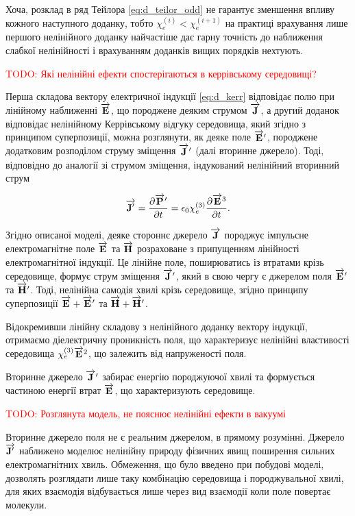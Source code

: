 Хоча, розклад в ряд Тейлора \eqref{eq:d_teilor_odd} не гарантує зменшення 
впливу кожного наступного доданку, тобто $ \chi_e^{(i)} < \chi_e^{(i+1)} $
на практиці врахування лише першого нелінійного доданку найчастіше дає
гарну точність до наближення слабкої нелінійності і врахуванням доданків
вищих порядків нехтують.

\textcolor{red}{TODO: Які нелінійні ефекти спостерігаються в 
керрівському середовищі?}

Перша складова вектору електричної індукції \eqref{eq:d_kerr} відповідає 
полю при лінійному наближенні $ \overrightarrow{\mathbf E} $, що породжене деяким 
струмом $ \overrightarrow{\mathbf J} $, а другий доданок відповідає нелінійному Керрівському 
відгуку середовища, який згідно з принципом суперпозиції, можна розглянути, 
як деяке поле $ \overrightarrow{\mathbf E}^\prime $, породжене додатковим розподілом струму 
зміщення $ \overrightarrow{\mathbf J}^\prime $ (далі вторинне джерело). Тоді, відповідно до
аналогії зі струмом зміщення, індукований нелінійний вторинний струм

\begin{equation} \label{eq:j_kerr}
\overrightarrow{\mathbf J^\prime} = \frac{\partial \overrightarrow{\mathbf P}^\prime}{\partial t} = 
\epsilon_0 \chi_e^{(3)} \frac{\partial \overrightarrow{\mathbf E}^3}{\partial t}.
\end{equation}

Згідно описаної моделі, деяке стороннє джерело $ \overrightarrow{\mathbf J} $ породжує 
імпульсне електромагнітне поле $ \overrightarrow{\mathbf E} $ та $ \overrightarrow{\mathbf H} $ розраховане
з припущенням лінійності електромагнітної індукції. Це лінійне поле, 
поширюватись із втратами крізь середовище, формує струм зміщення 
$ \overrightarrow{\mathbf J}^\prime $, який в свою чергу є джерелом поля $ \overrightarrow{\mathbf E}^\prime $ 
та $ \overrightarrow{\mathbf H}^\prime $. Тоді, нелінійна самодія хвилі крізь середовище, 
згідно принципу суперпозиції $ \overrightarrow{\mathbf E} + \overrightarrow{\mathbf E}^\prime $ та 
$ \overrightarrow{\mathbf H} + \overrightarrow{\mathbf H}^\prime $.

Відокремивши лінійну складову з нелінійного доданку вектору індукції, 
отримаємо діелектричну проникність поля, що характеризує нелінійні 
властивості середовища $ \chi_e^{(3)} \overrightarrow{\mathbf E}^2 $, що залежить від 
напруженості поля.

Вторинне джерело $ \overrightarrow{\mathbf J}^\prime $ забирає енергію породжуючої хвилі та 
формується частиною енергії втрат $ \overrightarrow{\mathbf E} $, що характеризують середовище.

\textcolor{red}{TODO: Розглянута модель, не пояснює нелінійні ефекти в вакуумі}

Вторинне джерело поля не є реальним джерелом, в прямому розумінні. 
Джерело $ \overrightarrow{\mathbf J^\prime} $ наближено моделює нелінійну природу фізичних 
явищ поширення сильних електромагнітних хвиль. Обмеження, що було 
введено при побудові моделі, дозволять розглядати лише таку комбінацію 
середовища і породжувальної хвилі, для яких взаємодія відбувається лише
через вид взаємодії коли поле повертає молекули.

